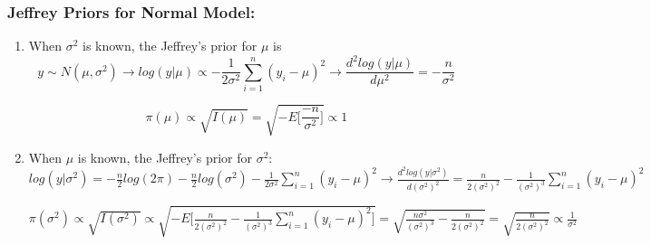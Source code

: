 \documentclass{beamer}
\begin{document}

\begin{frame}
\frametitle{Jeffrey Priors for Normal Model:}
\begin{enumerate}
\item  When $\sigma^2$ is known, the Jeffrey's prior for $\mu$ is
$$y \sim N(\mu, \sigma^2) \rightarrow log(y|\mu) \propto -\frac{1}{2\sigma^2} \sum_{i=1}^n (y_i - \mu)^2 \rightarrow \frac{d^2log(y|\mu)}{d\mu^2} = -\frac{n}{\sigma^2}$$ 

$$\pi(\mu ) \propto \sqrt{I(\mu)}  = \sqrt{-E\Big[\frac{-n}{\sigma^2}\Big]} \propto 1$$

\item  When $\mu$ is known, the Jeffrey's prior for $\sigma^2$: $log(y|\sigma^2) = - \frac{n}{2}log(2\pi) - \frac{n}{2}log(\sigma^2) -\frac{1}{2\sigma^2} \sum_{i=1}^n (y_i - \mu)^2 \rightarrow \frac{d^2log(y|\sigma^2)}{d(\sigma^2)^2} = \frac{n}{2(\sigma^2)^2} - \frac{1}{(\sigma^2)^3} \sum_{i=1}^n (y_i - \mu)^2$

$\pi(\sigma^2) \propto \sqrt{I(\sigma^2)}  \propto \sqrt{-E\Big[\frac{n}{2(\sigma^2)^2} - \frac{1}{(\sigma^2)^3} \sum_{i=1}^n (y_i - \mu)^2\Big]} = \sqrt{\frac{n\sigma^2}{(\sigma^2)^3}-\frac{n}{2(\sigma^2)^2}}=\sqrt{\frac{n}{2(\sigma^2)^2}} \propto \frac{1}{\sigma^2}$

\end{enumerate}

\end{frame}

\end{document}
